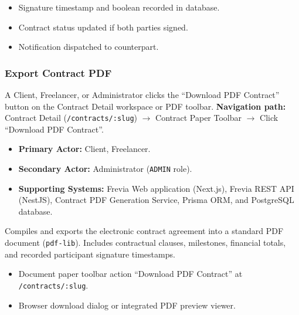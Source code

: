 \begin{itemize}[leftmargin=1.6em,topsep=3pt,itemsep=2pt,parsep=0pt,label=$\bullet$]
      \item Signature timestamp and boolean recorded in database.
      \item Contract status updated if both parties signed.
      \item Notification dispatched to counterpart.
\end{itemize}

\subsubsection{ Export Contract PDF}

A Client, Freelancer, or Administrator clicks the ``Download PDF Contract'' button on the Contract Detail workspace or PDF toolbar.\newline
\textbf{Navigation path:} Contract Detail (\texttt{/contracts/:slug}) $\rightarrow$ Contract Paper Toolbar $\rightarrow$ Click ``Download PDF Contract''.


\begin{itemize}[leftmargin=1.6em,topsep=3pt,itemsep=2pt,parsep=0pt,label=$\bullet$]
      \item \textbf{Primary Actor:} Client, Freelancer.
      \item \textbf{Secondary Actor:} Administrator (\texttt{ADMIN} role).
      \item \textbf{Supporting Systems:} Frevia Web application (Next.js), Frevia REST API (NestJS), Contract PDF Generation Service, Prisma ORM, and PostgreSQL database.
\end{itemize}

\noindent Compiles and exports the electronic contract agreement into a standard PDF document (\texttt{pdf-lib}). Includes contractual clauses, milestones, financial totals, and recorded participant signature timestamps.

\begin{itemize}[leftmargin=1.6em,topsep=3pt,itemsep=2pt,parsep=0pt,label=$\bullet$]
      \item Document paper toolbar action ``Download PDF Contract'' at \texttt{/contracts/:slug}.
      \item Browser download dialog or integrated PDF preview viewer.
\end{itemize}

